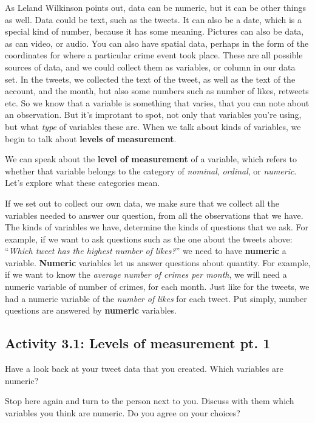 \documentclass[]{book}
\theoremstyle{definition}
\theoremstyle{definition}
\theoremstyle{definition}
\theoremstyle{remark}
\begin{document}
As Leland Wilkinson points out, data can be numeric, but it can be other
things as well. Data could be text, such as the tweets. It can also be a
date, which is a special kind of number, because it has some meaning.
Pictures can also be data, as can video, or audio. You can also have
spatial data, perhaps in the form of the coordinates for where a
particular crime event took place. These are all possible sources of
data, and we could collect them as variables, or column in our data set.
In the tweets, we collected the text of the tweet, as well as the text
of the account, and the month, but also some numbers such as number of
likes, retweets etc. So we know that a variable is something that
varies, that you can note about an observation. But it's improtant to
spot, not only that variables you're using, but what \emph{type} of
variables these are. When we talk about kinds of variables, we begin to
talk about \textbf{levels of measurement}.

We can speak about the \textbf{level of measurement} of a variable,
which refers to whether that variable belongs to the category of
\emph{nominal}, \emph{ordinal}, or \emph{numeric}. Let's explore what
these categories mean.

If we set out to collect our own data, we make sure that we collect all
the variables needed to answer our question, from all the observations
that we have. The kinds of variables we have, determine the kinds of
questions that we ask. For example, if we want to ask questions such as
the one about the tweets above: ``\emph{Which tweet has the highest
number of likes?}'' we need to have \textbf{numeric} a variable.
\textbf{Numeric} variables let us answer questions about quantity. For
example, if we want to know the \emph{average number of crimes per
month}, we will need a numeric variable of number of crimes, for each
month. Just like for the tweets, we had a numeric variable of the
\emph{number of likes} for each tweet. Put simply, number questions are
answered by \textbf{numeric} variables.

\hypertarget{activity-3.1-levels-of-measurement-pt.-1}{%
\subsection{Activity 3.1: Levels of measurement pt.
1}\label{activity-3.1-levels-of-measurement-pt.-1}}

 Have a look back at your tweet data that you created. Which variables
are numeric?

Stop here again and turn to the person next to you. Discuss with them
which variables you think are numeric. Do you agree on your choices?
\end{document}
